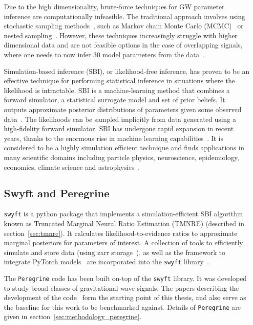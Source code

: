 Due to the high dimensionality, brute-force techniques for GW parameter inference are computationally infeasible. The traditional approach involves using stochastic sampling methods~\cite{Thrane_Talbot_2019}, such as Markov chain Monte Carlo (MCMC)~\cite{Metropolis_1953,Hastings_1970} or nested sampling~\cite{Skilling_2004}. However, these techniques increasingly struggle with higher dimensional data and are not feasible options in the case of overlapping signals, where one needs to now infer 30 model parameters from the data~\cite{alvey2023things}.

Simulation-based inference (SBI), or likelihood-free inference, has proven to be an effective technique for performing statistical inference in situations where the likelihood is intractable. SBI is a machine-learning method that combines a forward simulator, a statistical surrogate model and set of prior beliefs. It outputs approximate posterior distributions of parameters given some observed data~\cite{Miller2022}. The likelihoods can be sampled implicitly from data generated using a high-fidelity forward simulator. SBI has undergone rapid expansion in recent years, thanks to the enormous rise in machine learning capabilities~\cite{Cranmer_SBI_2020}. It is considered to be a highly simulation efficient technique and finds applications in many scientific domains including particle physics, neuroscience, epidemiology, economics, climate science and astrophysics~\cite{Cranmer_SBI_2020}.

\subsection{Swyft and Peregrine}

\texttt{swyft} is a python package that implements a simulation-efficient SBI algorithm known as Truncated Marginal Neural Ratio Estimation (TMNRE) (described in section~\ref{sec:tmnre}). It calculates likelihood-to-evidence ratios to approximate marginal posteriors for parameters of interest. A collection of tools to efficiently simulate and store data (using zarr storage~\cite{Miles_zarr_2021}), as well as the framework to integrate PyTorch models~\cite{paszke2019pytorch} are incorporated into the \texttt{swyft} library~\cite{Miller2022}.

The \texttt{Peregrine} code has been built on-top of the \texttt{swyft} library. It was developed to study broad classes of gravitational wave signals. The papers describing the development of the code~\cite{bhardwaj2023peregrine,alvey2023things} form the starting point of this thesis, and also serve as the baseline for this work to be benchmarked against. Details of \texttt{Peregrine} are given in section~\ref{sec:methodology_peregrine}.

